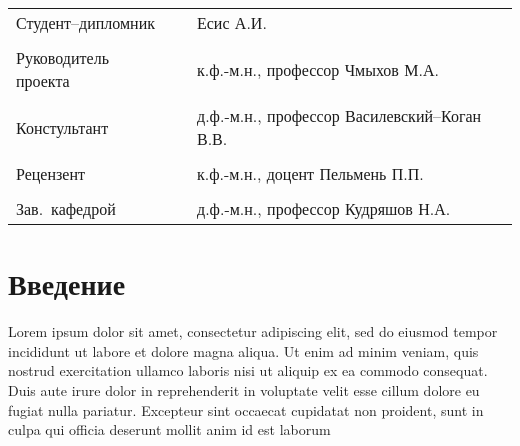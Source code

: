 \documentclass[a4paper,12pt]{extreport}
\numberwithin{equation}{chapter}
\begin{document}
\begin{flushleft}
    \begin{longtable}{lcl}
        Студент--дипломник   & \underline{\hspace{2.9cm}} & Есис А.И.                                    \\
                             &                            &                                              \\
        Руководитель проекта & \underline{\hspace{2.9cm}} & к.ф.-м.н., профессор Чмыхов М.А.             \\
                             &                            &                                              \\
        Констультант         & \underline{\hspace{2.9cm}} & д.ф.-м.н., профессор Василевский--Коган В.В. \\
                             &                            &                                              \\
        Рецензент            & \underline{\hspace{2.9cm}} & к.ф.-м.н., доцент Пельмень П.П.              \\
                             &                            &                                              \\
        Зав.~кафедрой \No 31 & \underline{\hspace{2.9cm}} & д.ф.-м.н., профессор Кудряшов Н.А.
    \end{longtable}
\end{flushleft}


\tableofcontents
\setcounter{page}{3}

\chapter*{Введение}

Lorem ipsum dolor sit amet, consectetur adipiscing elit, sed do eiusmod tempor incididunt ut labore et dolore magna aliqua. Ut enim ad minim veniam, quis nostrud exercitation ullamco laboris nisi ut aliquip ex ea commodo consequat. Duis aute irure dolor in reprehenderit in voluptate velit esse cillum dolore eu fugiat nulla pariatur. Excepteur sint occaecat cupidatat non proident, sunt in culpa qui officia deserunt mollit anim id est laborum
\end{document}

